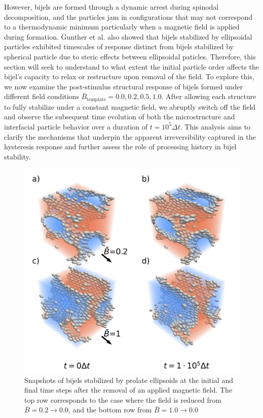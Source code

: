 However, bijels are formed through a dynamic arrest during spinodal decomposition, and the 
particles jam in configurations that may not correspond to a thermodynamic minimum particularly when a magnetic field is 
applied during formation. Gunther et al. also showed that bijels stabilized by ellipsoidal particles exhibited timescales 
of response distinct from bijels stabilized by spherical particle due to steric effects between ellipsoidal paticles.
Therefore, this section will seek to understand to what extent the initial particle order affects the 
bijel's capacity to relax or restructure upon removal of the field. To explore this, 
we now examine the post-stimulus structural response of bijels formed under different field conditions 
\(\bar{B}_{\text{template}} = 0.0, 0.2, 0.5, 1.0\). After allowing each structure to fully stabilize under a 
constant magnetic field, we abruptly switch off the field and observe the subsequent time evolution of both the 
microstructure and interfacial particle behavior over a duration of \(t = 10^5 \Delta t\). This analysis aims to 
clarify the mechanisms that underpin the apparent irreversibility captured in the hysteresis response and further 
assess the role of processing history in bijel stability.

\begin{figure} 
\centering 
\includegraphics[scale=0.45]{../figures/results/paper2/microstructure_viz-field_down.png} 
\caption{Snapshots of bijels stabilized by prolate ellipsoids at 
         the initial and final time steps after the removal of an applied magnetic field. The top row corresponds to the case where 
         the field is reduced from \(\bar{B} = 0.2 \rightarrow 0.0\), and the bottom row from \(\bar{B} = 1.0 \rightarrow 0.0\)}
\label{fig:microstructure_viz-field_down}
\end{figure}

